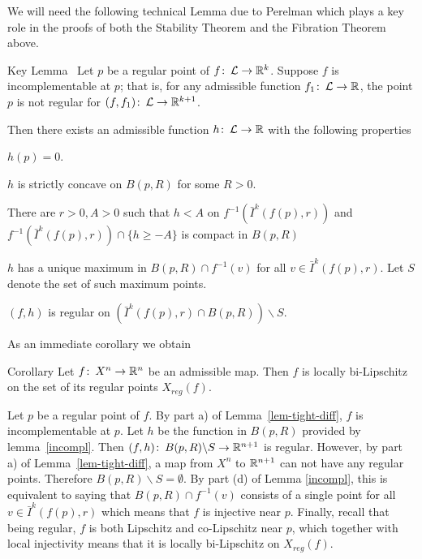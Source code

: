  
 
 We will need the following  technical Lemma  due to Perelman which plays a key  role in the proofs of both the Stability Theorem and the Fibration Theorem above.

\begin{thm}{Key Lemma}\label{incompl}~\cite[Section 3]{Per-Morse}
 Let $p$ be a regular point of $f\co \spc{L}\to \R^k$.  Suppose $f$ is incomplementable at $p$; that is,  for any admissible function  $f_1\co \spc{L}\to\R$, the point $p$ is not regular for $(f,f_1)\co \spc{L}\to \R^{k+1}$. 

Then there exists an admissible function $h\co \spc{L}\to\R$ with the following properties

\begin{subthm}{}  $h(p)=0$.
\end{subthm}

\begin{subthm}{} $h$ is strictly concave on $B(p,R)$ for some $R>0$.
\end{subthm}

\begin{subthm}{} There are $r>0, A>0$ such that  $h< A$ on $f^{-1}\left(\bar{I}^k(f(p),r) \right)$ and   $f^{-1}\left(\bar{I}^k(f(p),r) \right)\cap  \{h\ge -A\}$ is compact in $B(p,R)$\label{h-proper}
\end{subthm}


\begin{subthm}{} \label{kl-reg}$h$ has a unique maximum in $B(p,R)\cap f^{-1}(v)$ for all $v\in \bar{I}^k(f(p),r) $.  Let $S$ denote the set of such maximum points.
\item $(f,h)$ is regular on $\left(\bar{I}^k(f(p),r) \cap B(p,R)\right)\backslash S$.
\end{subthm}
\end{thm}


As an immediate corollary we obtain

\begin{thm}{Corollary}\label{bilip}
Let $f\co X^n\to\R^n$ be an admissible map. Then $f$ is locally bi-Lipschitz on the set of its regular points $X_{reg}(f)$.
\end{thm}


Let $p$ be a regular point of $f$.  By part a) of Lemma~\ref{lem-tight-diff}, $f$ is incomplementable at $p$. Let $h$ be the function in $B(p,R)$ provided by lemma~\ref{incompl}.  Then $(f,h)\co B(p,R)\backslash S\to\R^{n+1}$ is regular. However,  by part a) of Lemma~\ref{lem-tight-diff},  a map from $X^n$ to $\mathbb{R}^{n+1}$ can not have any regular points. Therefore $B(p,R)\backslash S=\emptyset$. By part (d) of Lemma \ref{incompl}, this is equivalent to saying that $B(p,R)\cap f^{-1}(v)$  consists of a single point for all $v\in \bar{I}^k(f(p),r)$  which means that $f$ is  injective near $p$. Finally, recall that being regular,  $f$ is both Lipschitz and co-Lipschitz near $p$, which together with local injectivity means that it is locally bi-Lipschitz on  $X_{reg}(f)$.\qeds

